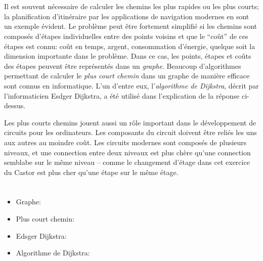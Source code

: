 {{\section*{\BrochureItsInformatics}
Il est souvent nécessaire de calculer les chemins les plus rapides ou les plus courts; la planification d’itinéraire par les applications de navigation modernes en sont un exemple évident. Le problème peut être fortement simplifié si les chemins sont composés d’étapes individuelles entre des points voisins et que le “coût” de ces étapes est connu: coût en temps, argent, consommation d’énergie, quelque soit la dimension importante dans le problème. Dans ce cas, les points, étapes et coûts des étapes peuvent être représentés dans un \emph{graphe}. Beaucoup d’algorithmes permettant de calculer le \emph{plus court chemin} dans un graphe de manière efficace sont connus en informatique. L’un d’entre eux, l’\emph{algorithme de Dijkstra}, décrit par l’informaticien Esdger Dijkstra, a été utilisé dans l’explication de la réponse ci-dessus.

Les plus courts chemins jouent aussi un rôle important dans le développement de circuits pour les ordinateurs. Les composants du circuit doivent être reliés les uns aux autres au moindre coût. Les circuits modernes sont composés de plusieurs niveaux, et une connection entre deux niveaux est plus chère qu’une connection semblabe sur le même niveau – comme le changement d’étage dans cet exercice du Castor est plus cher qu’une étape sur le même étage.



\section*{\BrochureWebsitesAndKeywords}
{\raggedright
\begin{itemize}
  \item Graphe: \href{https://fr.wikipedia.org/wiki/Graphe_(math\%C3\%A9matiques_discr\%C3\%A8tes)}{}
  \item Plus court chemin: \href{https://fr.wikipedia.org/wiki/Probl\%C3\%A8me_de_plus_court_chemin}{}
  \item Edsger Dijkstra: \href{https://fr.wikipedia.org/wiki/Edsger_Dijkstra}{}
  \item Algorithme de Dijkstra: \href{https://fr.wikipedia.org/wiki/Algorithme_de_Dijkstra}{}
\end{itemize}


}}}

